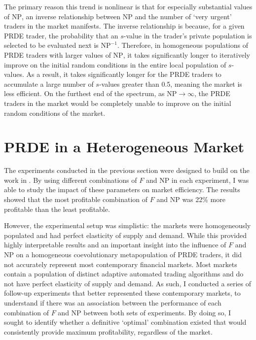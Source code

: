 \documentclass[conference]{IEEEtran}
\begin{document}
The primary reason this trend is nonlinear is that for especially substantial values of $\mathrm{NP}$, an inverse relationship between $\mathrm{NP}$ and the number of `very urgent' traders in the market manifests.
The inverse relationship is because, for a given PRDE trader, the probability that an $s$-value in the trader's private population is selected to be evaluated next is $\mathrm{NP}^{-1}$.
Therefore, in homogeneous populations of PRDE traders with larger values of $\mathrm{NP}$, it takes significantly longer to iteratively improve on the initial random conditions in the entire local population of $s$-values.
As a result, it takes significantly longer for the PRDE traders to accumulate a large number of $s$-values greater than 0.5, meaning the market is less efficient.
On the furthest end of the spectrum, as $\mathrm{NP}\to\infty$, the PRDE traders in the market would be completely unable to improve on the initial random conditions of the market.

\section{PRDE in a Heterogeneous Market}

The experiments conducted in the previous section were designed to build on the work in \cite{PRDE}.
By using different combinations of $F$ and $\mathrm{NP}$ in each experiment, I was able to study the impact of these parameters on market efficiency.
The results showed that the most profitable combination of $F$ and $\mathrm{NP}$ was 22\% more profitable than the least profitable.

However, the experimental setup was simplistic: the markets were homogeneously populated and had perfect elasticity of supply and demand.
While this provided highly interpretable results and an important insight into the influence of $F$ and $\mathrm{NP}$ on a homogeneous coevolutionary metapopulation of PRDE traders, it did not accurately represent most contemporary financial markets.
Most markets contain a population of distinct adaptive automated trading algorithms and do not have perfect elasticity of supply and demand.
As such, I conducted a series of follow-up experiments that better represented these contemporary markets, to understand if there was an association between the performance of each combination of $F$ and $\mathrm{NP}$ between both sets of experiments.
By doing so, I sought to identify whether a definitive `optimal' combination existed that would consistently provide maximum profitability, regardless of the market.
\end{document}
